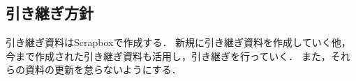\subsection*{引き継ぎ方針}


引き継ぎ資料はScrapboxで作成する．
新規に引き継ぎ資料を作成していく他，今まで作成された引き継ぎ資料も活用し，引き継ぎを行っていく．
また，それらの資料の更新を怠らないようにする．

